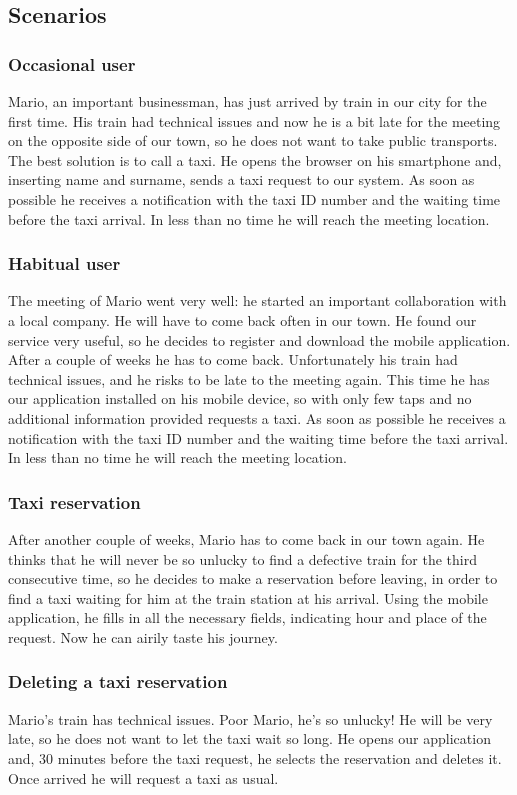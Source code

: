 	\subsection{Scenarios}
		\subsubsection{Occasional user}
			Mario, an important businessman, has just arrived by train in our city for the first time.
			His train had technical issues and now he is a bit late for the meeting on 
			the opposite side of our town, so he does not want to take public transports.
			The best solution is to call a taxi.
			He opens the browser on his smartphone and, inserting name and surname, sends a taxi request
			to our system. As soon as possible he receives a notification with the taxi ID number and the
			waiting time before the taxi arrival. In less than no time he will reach the meeting location.
		\subsubsection{Habitual user}
			The meeting of Mario went very well: he started an important collaboration with a local
			company. He will have to come back often in our town. He found our service very useful, so
			he decides to register and download the mobile application. After a couple of weeks he has to
			come back. Unfortunately his train had technical issues, and he risks to be late to the
			meeting again. This time he has our application installed on his mobile device, so with only
			few taps and no additional information provided requests a taxi. As soon as possible he receives
			a notification with the taxi ID number and the	waiting time before the taxi arrival.
			In less than no time he will reach the meeting location.
		\subsubsection{Taxi reservation}
			After another couple of weeks, Mario has to come back in our town again. He thinks that he 
			will never be so unlucky to find a defective train for the third consecutive time,
			so he decides to make a reservation before leaving,	in order to find a taxi waiting for him
			at the train station at his arrival. Using the mobile application, he fills in all the
			necessary fields, indicating hour and place of the request.
			Now he can airily taste	his journey.
		\subsubsection{Deleting a taxi reservation}
			Mario's train has technical issues. Poor Mario, he's so unlucky! He will be very late, 
			so he does not want to let the taxi wait so long. He opens our application and, 30 minutes
			before the taxi request, he selects the reservation and deletes it. Once arrived he will
			request a taxi as usual.
